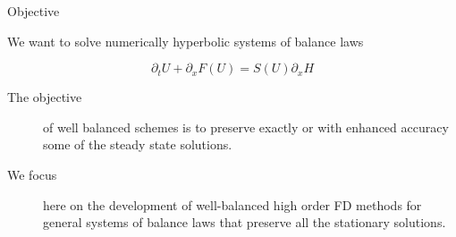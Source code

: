 \begin{frame}[t]{Objective}
\MyLogoa

\vspace{0.5cm}

We want to solve numerically  hyperbolic systems of balance laws

\begin{equation}
	\partial_tU+ \partial_x F(U)=  S(U)\partial_xH \nonumber
\end{equation}
 
 
 \vspace{0.5cm}
\begin{description}
	\item[The objective]  of well balanced schemes is to preserve exactly or with enhanced accuracy some of the steady state
	solutions.
	\vspace{0.1cm}
	\item[We focus] here on the development of well-balanced high order FD methods for general systems of balance laws that preserve all the stationary solutions.  
\end{description}


%
%
%
%
%
%
%
 
\end{frame}




